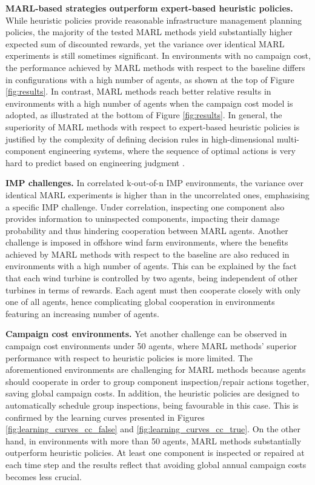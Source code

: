 \textbf{MARL-based strategies outperform expert-based heuristic policies.}
While heuristic policies provide reasonable infrastructure management planning policies, the majority of the tested MARL methods yield substantially higher expected sum of discounted rewards, yet the variance over identical MARL experiments is still sometimes significant.
In environments with no campaign cost, the performance achieved by MARL methods with respect to the baseline differs in configurations with a high number of agents, as shown at the top of Figure \ref{fig:results}.
In contrast, MARL methods reach better relative results in environments with a high number of agents when the campaign cost model is adopted, as illustrated at the bottom of Figure \ref{fig:results}. 
In general, the superiority of MARL methods with respect to expert-based heuristic policies is justified by the complexity of defining decision rules in high-dimensional multi-component engineering systems, where the sequence of optimal actions is very hard to predict based on engineering judgment \citep{morato2022syst}.

\textbf{IMP challenges.}
In correlated k-out-of-n IMP environments, the variance over identical MARL experiments is higher than in the uncorrelated ones, emphasising a specific IMP challenge.
Under correlation, inspecting one component also provides information to uninspected components, impacting their damage probability and thus hindering cooperation between MARL agents.
Another challenge is imposed in offshore wind farm environments, where the benefits achieved by MARL methods with respect to the baseline are also reduced in environments with a high number of agents.
This can be explained by the fact that each wind turbine is controlled by two agents, being independent of other turbines in terms of rewards.
Each agent must then cooperate closely with only one of all agents, hence complicating global cooperation in environments featuring an increasing number of agents.

\textbf{Campaign cost environments.} Yet another challenge can be observed in campaign cost environments under 50 agents, where MARL methods' superior performance with respect to heuristic policies is more limited.
The aforementioned environments are challenging for MARL methods because agents should cooperate in order to group component inspection/repair actions together, saving global campaign costs.
In addition, the heuristic policies are designed to automatically schedule group inspections, being favourable in this case.
This is confirmed by the learning curves presented in Figures \ref{fig:learning_curves_cc_false} and \ref{fig:learning_curves_cc_true}.
On the other hand, in environments with more than 50 agents, MARL methods substantially outperform heuristic policies.
At least one component is inspected or repaired at each time step and the results reflect that avoiding global annual campaign costs becomes less crucial.

